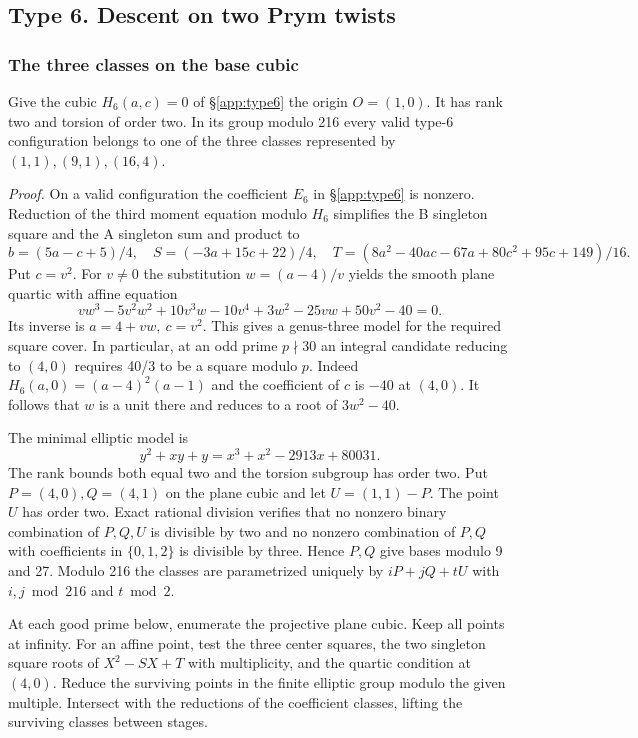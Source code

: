 \subsection{Type 6. Descent on two Prym twists}\label{detail:type6}

\subsubsection{The three classes on the base cubic}\label{arith:66}

Give the cubic \(H_6(a,c)=0\) of \S\ref{app:type6} the origin
\(O=(1,0)\). It has rank two and torsion of order two. In its group
modulo 216 every valid type-6 configuration belongs to one of the
three classes represented by \((1,1),(9,1),(16,4)\).

\emph{Proof.} On a valid configuration the coefficient \(E_6\) in \S\ref{app:type6}
is nonzero. Reduction of the third moment equation modulo \(H_6\)
simplifies the B singleton square and the A singleton sum and product to
\[b=(5a-c+5)/4,\quad S=(-3a+15c+22)/4,\quad
 T=(8a^2-40ac-67a+80c^2+95c+149)/16.\]
Put \(c=v^2\). For \(v\ne0\) the substitution \(w=(a-4)/v\) yields
the smooth plane quartic with affine equation
\[vw^3-5v^2w^2+10v^3w-10v^4+3w^2-25vw+50v^2-40=0.\]
Its inverse is \(a=4+vw,\ c=v^2\). This gives a genus-three model for
the required square cover. In particular, at an odd prime \(p\nmid30\)
an integral candidate reducing to \((4,0)\) requires 40/3 to be a
square modulo \(p\). Indeed \(H_6(a,0)=(a-4)^2(a-1)\) and the
coefficient of \(c\) is \(-40\) at \((4,0)\). It follows that
\(w\) is a unit there and reduces to a root of \(3w^2-40\).

The minimal elliptic model is
\[y^2+xy+y=x^3+x^2-2913x+80031.\]
The rank bounds both equal two and the torsion subgroup has order two.
Put \(P=(4,0),Q=(4,1)\) on the plane cubic and let \(U=(1,1)-P\).
The point \(U\) has order two. Exact rational division verifies that
no nonzero binary combination of \(P,Q,U\) is divisible by two and
no nonzero combination of \(P,Q\) with coefficients in
\(\{0,1,2\}\) is divisible by three. Hence \(P,Q\) give bases modulo
9 and 27. Modulo 216 the classes are parametrized uniquely by
\(iP+jQ+tU\) with \(i,j\bmod216\) and \(t\bmod2\).

At each good prime below, enumerate the projective plane cubic.
Keep all points at infinity. For an affine point, test the three
center squares, the two singleton square roots of \(X^2-SX+T\)
with multiplicity, and the quartic condition at \((4,0)\).
Reduce the surviving points in the finite elliptic group modulo the
given multiple. Intersect with the reductions of the coefficient
classes, lifting the surviving classes between stages.

